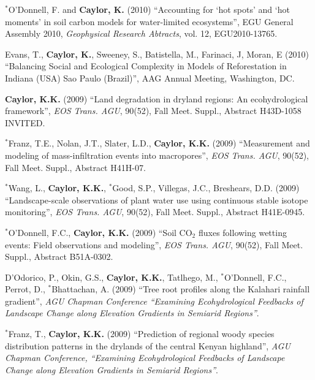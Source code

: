 \documentclass[10pt]{article}
\begin{document}
\begin{etaremune}
\item $^{*}$O'Donnell, F. and \textbf{Caylor, K.} (2010) ``Accounting for `hot spots' and `hot moments' in soil carbon models for water-limited ecosystems'', EGU General Assembly 2010, \emph{Geophysical Research Abtracts}, vol. 12, EGU2010-13765.

\item Evans, T., \textbf{Caylor, K.}, Sweeney, S., Batistella, M., Farinaci, J, Moran, E (2010) ``Balancing Social and Ecological Complexity in Models of Reforestation in Indiana (USA) Sao Paulo (Brazil)'', AAG Annual Meeting, Washington, DC.

\item \textbf{Caylor, K.K.} (2009) ``Land degradation in dryland regions: An ecohydrological framework'', \emph{EOS Trans. AGU}, 90(52), Fall Meet. Suppl., Abstract H43D-1058 INVITED. 

\item $^{*}$Franz, T.E., Nolan, J.T., Slater, L.D.,  \textbf{Caylor, K.K.} (2009) ``Measurement and modeling of mass-infiltration events into macropores'', \emph{EOS Trans. AGU}, 90(52), Fall Meet. Suppl., Abstract H41H-07.

\item $^{*}$Wang, L.,  \textbf{Caylor, K.K.}, $^{*}$Good, S.P., Villegas, J.C., Breshears, D.D. (2009) ``Landscape-scale observations of plant water use using continuous stable isotope monitoring'', \emph{EOS Trans. AGU}, 90(52), Fall Meet. Suppl., Abstract H41E-0945.

\item $^{*}$O'Donnell, F.C., \textbf{Caylor, K.K.} (2009) ``Soil CO$_{2}$ fluxes following wetting events: Field observations and modeling'', \emph{EOS Trans. AGU}, 90(52), Fall Meet. Suppl., Abstract B51A-0302.

\item D'Odorico, P., Okin, G.S., \textbf{Caylor, K.K.}, Tatlhego, M.,  $^{*}$O'Donnell, F.C., Perrot, D., $^{*}$Bhattachan, A. (2009) ``Tree root profiles along the Kalahari rainfall gradient'', \emph{AGU Chapman Conference  ``Examining Ecohydrological Feedbacks of Landscape Change along Elevation Gradients in Semiarid Regions''}.

\item $^{*}$Franz, T., \textbf{Caylor, K.K.} (2009) ``Prediction of regional woody species distribution patterns in the drylands of the central Kenyan highland'', \emph{AGU Chapman Conference, ``Examining Ecohydrological Feedbacks of Landscape Change along Elevation Gradients in Semiarid Regions''}.


\end{etaremune}
\end{document}
